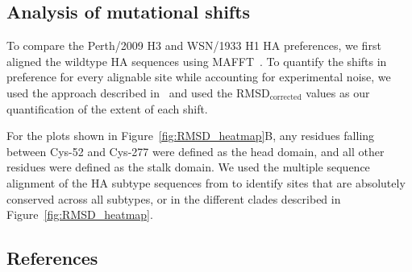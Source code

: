 \documentclass[9pt,twocolumn,twoside]{pnas-new}
\begin{document}
{\subsection*{Analysis of mutational shifts}
To compare the Perth/2009 H3 and WSN/1933 H1 HA preferences, we first aligned the wildtype HA sequences using MAFFT~\cite{katoh2013mafft}.
To quantify the shifts in preference for every alignable site while accounting for experimental noise, we used the approach described in~\cite{haddox2017mapping} and used the RMSD$_{\text{corrected}}$ values as our quantification of the extent of each shift.

For the plots shown in Figure~\ref{fig:RMSD_heatmap}B, any residues falling between Cys-52 and Cys-277 were defined as the head domain, and all other residues were defined as the stalk domain.
We used the multiple sequence alignment of the HA subtype sequences from \cite{doud2017quantifying} to identify sites that are absolutely conserved across all subtypes, or in the different clades described in Figure~\ref{fig:RMSD_heatmap}.
}

\showmatmethods{} %


\showacknow{} %


\subsection*{References}

\end{document}

